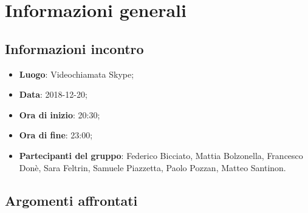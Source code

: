 \section{Informazioni generali}

\subsection{Informazioni incontro}
\begin{itemize}
\item \textbf{Luogo}: Videochiamata Skype;
\item \textbf{Data}: 2018-12-20;
\item \textbf{Ora di inizio}: 20:30;
\item \textbf{Ora di fine}: 23:00;
\item \textbf{Partecipanti del gruppo}: Federico Bicciato, Mattia Bolzonella, 
Francesco Donè, Sara Feltrin, Samuele Piazzetta, Paolo Pozzan, 
Matteo Santinon. 
\end{itemize}

\subsection{Argomenti affrontati}

